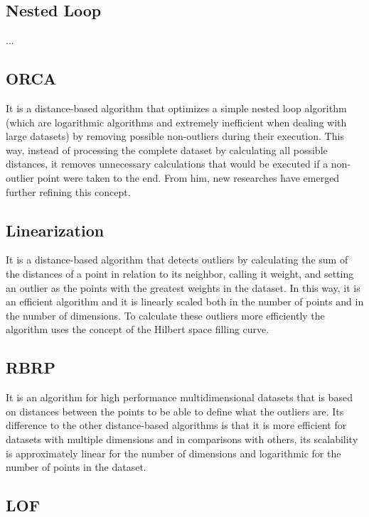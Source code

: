 \subsection{Nested Loop}

...

\subsection{ORCA}

It is a distance-based algorithm that optimizes a simple nested loop algorithm (which are
logarithmic algorithms and extremely inefficient when dealing with large datasets) by 
removing possible non-outliers during their execution. This way, instead of processing
the complete dataset by calculating all possible distances, it removes unnecessary 
calculations that would be executed if a non-outlier point were taken to the end. From him,
new researches have emerged further refining this concept.

\subsection{Linearization}

It is a distance-based algorithm that detects outliers by calculating the sum of the 
distances of a point in relation to its neighbor, calling it weight, and setting an 
outlier as the points with the greatest weights in the dataset. In this way, it is an 
efficient algorithm and it is linearly scaled both in the number of points and in the 
number of dimensions. To calculate these outliers more efficiently the algorithm uses 
the concept of the Hilbert space filling curve.

\subsection{RBRP}

It is an algorithm for high performance multidimensional datasets that is based on 
distances between the points to be able to define what the outliers are. Its difference
to the other distance-based algorithms is that it is more efficient for datasets with 
multiple dimensions and in comparisons with others, its scalability is approximately 
linear for the number of dimensions and logarithmic for the number of points in the 
dataset.

\subsection{LOF}

